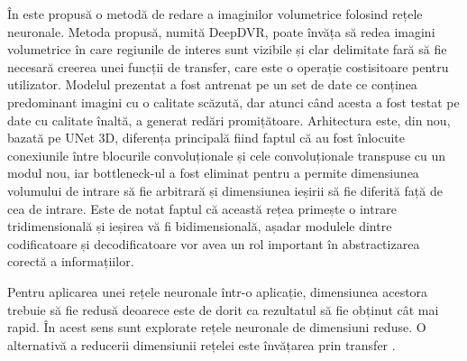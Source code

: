 În \cite{weiss2021deep} este propusă o metodă de redare a imaginilor volumetrice folosind rețele neuronale. Metoda propusă, numită DeepDVR, poate învăța să redea imagini volumetrice în care regiunile de interes sunt vizibile și clar delimitate fară să fie necesară creerea unei funcții de transfer, care este o operație costisitoare pentru utilizator. Modelul prezentat a fost antrenat pe un set de date ce conținea predominant imagini cu o calitate scăzută, dar atunci când acesta a fost testat pe date cu calitate înaltă, a generat redări promițătoare. Arhitectura este, din nou, bazată pe UNet 3D, diferența principală fiind faptul că au fost înlocuite conexiunile între blocurile convoluționale și cele convoluționale transpuse cu un modul nou, iar bottleneck-ul a fost eliminat pentru a permite dimensiunea volumului de intrare să fie arbitrară și dimensiunea ieșirii să fie diferită față de cea de intrare. Este de notat faptul că această rețea primește o intrare tridimensională și ieșirea vă fi bidimensională, așadar modulele dintre codificatoare și decodificatoare vor avea un rol important în abstractizarea corectă a informațiilor.

Pentru aplicarea unei rețele neuronale într-o aplicație, dimensiunea acestora trebuie să fie redusă deoarece este de dorit ca rezultatul să fie obținut cât mai rapid. În acest sens sunt explorate rețele neuronale de dimensiuni reduse. O alternativă a reducerii dimensiunii rețelei este învățarea prin transfer \cite{chen2019med3d}.
